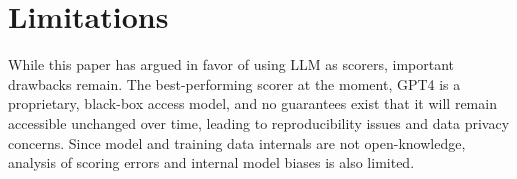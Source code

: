 




%



\section*{Limitations}
\label{sec:limitations}
While this paper has argued in favor of using LLM as scorers, important drawbacks remain. 
The best-performing scorer at the moment, GPT4 is a proprietary, black-box access model, and no guarantees exist that it will remain accessible unchanged over time, leading to reproducibility issues and data privacy concerns. Since model and training data internals are not open-knowledge, analysis of scoring errors and internal model biases is also limited. 

